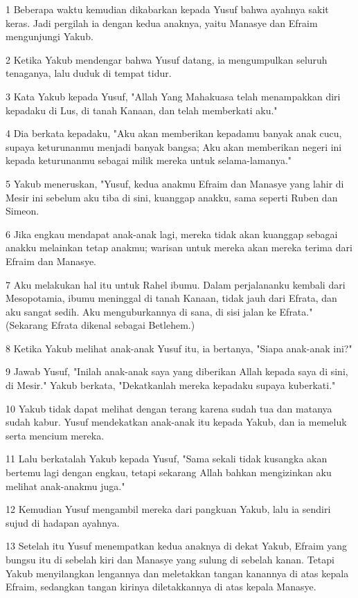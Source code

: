\par 1 Beberapa waktu kemudian dikabarkan kepada Yusuf bahwa ayahnya sakit keras. Jadi pergilah ia dengan kedua anaknya, yaitu Manasye dan Efraim mengunjungi Yakub.
\par 2 Ketika Yakub mendengar bahwa Yusuf datang, ia mengumpulkan seluruh tenaganya, lalu duduk di tempat tidur.
\par 3 Kata Yakub kepada Yusuf, "Allah Yang Mahakuasa telah menampakkan diri kepadaku di Lus, di tanah Kanaan, dan telah memberkati aku."
\par 4 Dia berkata kepadaku, "Aku akan memberikan kepadamu banyak anak cucu, supaya keturunanmu menjadi banyak bangsa; Aku akan memberikan negeri ini kepada keturunanmu sebagai milik mereka untuk selama-lamanya."
\par 5 Yakub meneruskan, "Yusuf, kedua anakmu Efraim dan Manasye yang lahir di Mesir ini sebelum aku tiba di sini, kuanggap anakku, sama seperti Ruben dan Simeon.
\par 6 Jika engkau mendapat anak-anak lagi, mereka tidak akan kuanggap sebagai anakku melainkan tetap anakmu; warisan untuk mereka akan mereka terima dari Efraim dan Manasye.
\par 7 Aku melakukan hal itu untuk Rahel ibumu. Dalam perjalananku kembali dari Mesopotamia, ibumu meninggal di tanah Kanaan, tidak jauh dari Efrata, dan aku sangat sedih. Aku menguburkannya di sana, di sisi jalan ke Efrata." (Sekarang Efrata dikenal sebagai Betlehem.)
\par 8 Ketika Yakub melihat anak-anak Yusuf itu, ia bertanya, "Siapa anak-anak ini?"
\par 9 Jawab Yusuf, "Inilah anak-anak saya yang diberikan Allah kepada saya di sini, di Mesir." Yakub berkata, "Dekatkanlah mereka kepadaku supaya kuberkati."
\par 10 Yakub tidak dapat melihat dengan terang karena sudah tua dan matanya sudah kabur. Yusuf mendekatkan anak-anak itu kepada Yakub, dan ia memeluk serta mencium mereka.
\par 11 Lalu berkatalah Yakub kepada Yusuf, "Sama sekali tidak kusangka akan bertemu lagi dengan engkau, tetapi sekarang Allah bahkan mengizinkan aku melihat anak-anakmu juga."
\par 12 Kemudian Yusuf mengambil mereka dari pangkuan Yakub, lalu ia sendiri sujud di hadapan ayahnya.
\par 13 Setelah itu Yusuf menempatkan kedua anaknya di dekat Yakub, Efraim yang bungsu itu di sebelah kiri dan Manasye yang sulung di sebelah kanan. Tetapi Yakub menyilangkan lengannya dan meletakkan tangan kanannya di atas kepala Efraim, sedangkan tangan kirinya diletakkannya di atas kepala Manasye.
